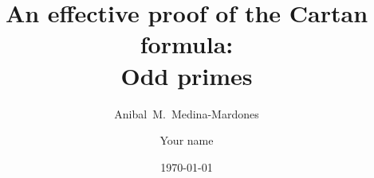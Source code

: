 \documentclass{amsart}
\title[An effective proof of the Cartan formula: Odd primes]{An effective proof of the Cartan formula:\\Odd primes}
\author[A.~Medina-Mardones]{Anibal~M.~Medina-Mardones}
\author[Your short name]{Your name}
\date{\today}
\begin{document}
	
	\maketitle
	
	
	
	
	
	
	\sloppy
	\printbibliography
	\todos
\end{document}
